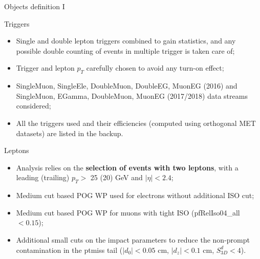 \documentclass[8pt]{beamer}
\begin{document}
\begin{frame}{Objects definition I}
\justifying

\vspace{5pt} \begin{block}{\centering Triggers}\end{block} \vspace{-6pt}
\begin{itemize}
\justifying
\item \alert{Single and double lepton triggers} combined to gain statistics, and any possible double counting of events in multiple trigger is taken care of;
\item Trigger and lepton $p_T$ carefully chosen to avoid any turn-on effect;
\item SingleMuon, SingleEle, DoubleMuon, DoubleEG, MuonEG (2016) and SingleMuon, EGamma, DoubleMuon, MuonEG (2017/2018) data streams considered;
\item All the triggers used and their efficiencies (computed using orthogonal MET datasets) are listed in the backup.
\end{itemize} \vfill

\begin{block}{\centering Leptons}\end{block} \vspace{-6pt}
\begin{itemize}
\justifying
\item Analysis relies on the \textbf{selection of events with two leptons}, with a leading (trailing) $p_T >$ 25 (20) GeV and $|\eta| < 2.4$;
\item \alert{Medium cut based POG WP used for electrons} without additional ISO cut;
\item \alert{Medium cut based POG WP for muons} with tight ISO (pfRelIso04\_all $< 0.15$);
\item Additional small cuts on the impact parameters to reduce the non-prompt contamination in the ptmiss tail ($|d_0| < 0.05$ cm, $|d_z| < 0.1$ cm, $S_{3D}^d < 4$).
\end{itemize}
\end{frame}
\end{document}
